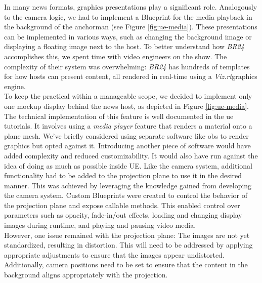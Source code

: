 \documentclass[
  a4paper,  %
  twoside,  %
  bibliography=totoc,
  headsepline,
  cleardoublepage=empty,
  parskip=half,
  draft=false
]{scrbook}
\begin{document}
In many news formats, graphics presentations play a significant role. Analogously to the camera logic, we had to implement a Blueprint for the media playback in the background of the anchorman (see Figure \ref{fig:ue-media}). These presentations can be implemented in various ways, such as changing the background image or displaying a floating image next to the host. To better understand how \textit{BR24} accomplishes this, we spent time with video engineers on the show. The complexity of their system was overwhelming: \textit{BR24} has hundreds of templates for how hosts can present content, all rendered in real-time using a \textit{Viz.rt}graphics engine. \\
To keep the practical within a manageable scope, we decided to implement only one mockup display behind the news host, as depicted in Figure \ref{fig:ue-media}. The technical implementation of this feature is well documented in the \gls{ue} tutorials. It involves using a \textit{media player} feature that renders a material onto a plane mesh. We've briefly considered using separate software like \gls{obs} to render graphics but opted against it. Introducing another piece of software would have added complexity and reduced customizability. It would also have run against the idea of doing as much as possible inside UE. Like the camera system, additional functionality had to be added to the projection plane to use it in the desired manner. This was achieved by leveraging the knowledge gained from developing the camera system. Custom Blueprints were created to control the behavior of the projection plane and expose callable methods. This enabled control over parameters such as opacity, fade-in/out effects, loading and changing display images during runtime, and playing and pausing video media. \\
However, one issue remained with the projection plane: The images are not yet standardized, resulting in distortion. This will need to be addressed by applying appropriate adjustments to ensure that the images appear undistorted. Additionally, camera positions need to be set to ensure that the content in the background aligns appropriately with the projection.
\end{document}
